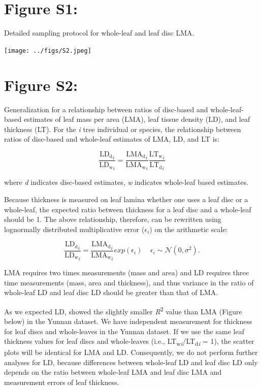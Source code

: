 \documentclass[
  12pt,
]{article}
\begin{document}
\newpage

\hypertarget{figure-s1}{%
\section{Figure S1:}\label{figure-s1}}

Detailed sampling protocol for whole-leaf and leaf disc LMA.

\begin{center}
\texttt{[image: ../figs/S2.jpeg]}

\end{center}

\newpage

\hypertarget{figure-s2}{%
\section{Figure S2:}\label{figure-s2}}

Generalization for a relationship between ratios of disc-based and whole-leaf-based estimates of leaf mass per area (LMA), leaf tissue density (LD), and leaf thickness (LT).
For the \emph{i} tree individual or species, the relationship between ratios of disc-based and whole-leaf estimates of LMA, LD, and LT is:

\[
\frac{\mathrm{LD_d}_i}{\mathrm{LD_w}_i} = \frac{\mathrm{LMA_d}_i}{\mathrm{LMA_w}_i} \frac{\mathrm{LT_w}_i}{\mathrm{LT_d}_i}
\]

where \emph{d} indicates disc-based estimates, \emph{w} indicates whole-leaf based estimates.

Because thickness is measured on leaf lamina whether one uses a leaf disc or a whole-leaf, the expected ratio between thickness for a leaf disc and a whole-leaf should be 1.
The above relationship, therefore, can be rewritten using lognormally distributed multiplicative error (\(\epsilon_i\)) on the arithmetic scale:

\[
\frac{\mathrm{LD_d}_i}{\mathrm{LD_w}_i} = \frac{\mathrm{LMA_d}_i}{\mathrm{LMA_w}_i} exp(\epsilon_i) \;\;\;\;\epsilon_i \sim \mathcal{N}(0, \sigma^2).
\]

LMA requires two times measurements (mass and area) and LD requires three time measurements (mass, area and thickness), and thus variance in the ratio of whole-leaf LD and leaf disc LD should be greater than that of LMA.

As we expected LD, showed the slightly smaller \emph{R}\textsuperscript{2} value than LMA (Figure below) in the Yunnan dataset.
We have independent measurement for thickness for leaf discs and whole-leaves in the Yunnan dataset.
If we use the same leaf thickness values for leaf discs and whole-leaves (i.e., LT\textsubscript{w\emph{i}}/LT\textsubscript{d\emph{i}} = 1), the scatter plots will be identical for LMA and LD.
Consequently, we do not perform further analyses for LD, because differences between whole-leaf LD and leaf disc LD only depends on the ratio between whole-leaf LMA and leaf disc LMA and measurement errors of leaf thickness.
\end{document}

